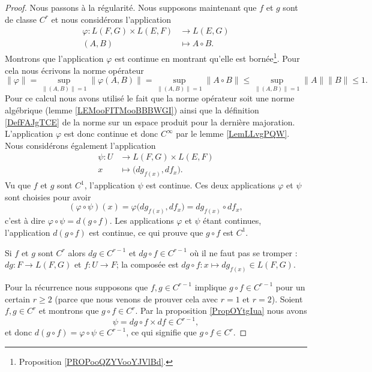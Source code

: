 \begin{proof}
    Nous passons à la régularité. Nous supposons maintenant que \( f\) et \( g\) sont de classe \( C^r\) et nous considérons l'application
    \begin{equation}
        \begin{aligned}
            \varphi\colon L(F,G)\times L(E,F)&\to L(E,G) \\
            (A,B)&\mapsto A\circ B. 
        \end{aligned}
    \end{equation}
    Montrons que l'application \( \varphi\) est continue en montrant qu'elle est bornée\footnote{Proposition \ref{PROPooQZYVooYJVlBd}.}. Pour cela nous écrivons la norme opérateur
    \begin{equation}
        \| \varphi \|=\sup_{\| (A,B) \|=1}\| \varphi(A,B) \|=\sup_{\| (A,B) \|=1}\| A\circ B \|\leq\sup_{\| (A,B) \|=1}\| A \|\| B \|\leq 1.
    \end{equation}
    Pour ce calcul nous avons utilisé le fait que la norme opérateur soit une norme algébrique (lemme \ref{LEMooFITMooBBBWGI}) ainsi que la définition \ref{DefFAJgTCE} de la norme sur un espace produit pour la dernière majoration. L'application \( \varphi\) est donc continue et donc \(  C^{\infty}\) par le lemme \ref{LemLLvgPQW}. Nous considérons également l'application
    \begin{equation}
        \begin{aligned}
        \psi\colon U&\to L(F,G)\times L(E,F) \\
        x&\mapsto \big( dg_{f(x)},df_x \big). 
        \end{aligned}
    \end{equation}
    Vu que \( f\) et \( g\) sont \( C^1\), l'application \( \psi\) est continue. Ces deux applications \( \varphi\) et \( \psi\) sont choisies pour avoir
    \begin{equation}
        (\varphi\circ\psi)(x)=\varphi\big( dg_{f(x)},df_x \big)=dg_{f(x)}\circ df_x,
    \end{equation}
    c'est à dire \( \varphi\circ\psi=d(g\circ f)\). Les applications \( \varphi\) et \( \psi\) étant continues, l'application \( d(g\circ f)\) est continue, ce qui prouve que \( g\circ f\) est \( C^1\).

    Si \( f\) et \( g\) sont \( C^r\) alors \( dg\in C^{r-1}\) et \( dg\circ f\in C^{r-1}\) où il ne faut pas se tromper : \( dg\colon F\to L(F,G)\) et \( f\colon U\to F\); la composée est \( dg\circ f\colon x\mapsto dg_{f(x)}\in L(F,G)\). 
    
    Pour la récurrence nous supposons que \( f,g\in C^{r-1}\) implique \( g\circ f\in C^{r-1}\) pour un certain \( r\geq 2\) (parce que nous venons de prouver cela avec \( r=1\) et \( r=2\)). Soient \( f,g\in C^r\) et montrons que \( g\circ f\in C^r\). Par la proposition \ref{PropOYtgIua} nous avons
    \begin{equation}
        \psi=dg\circ f\times df\in C^{r-1},
    \end{equation}
    et donc \( d(g\circ f)=\varphi\circ\psi\in C^{r-1}\), ce qui signifie que \( g\circ f\in C^r\).
\end{proof}

